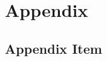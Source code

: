 \section*{Appendix}

\renewcommand{\thesubsection}{\Alph{subsection}}
\renewcommand{\thefigure}{\Alph{subsection}.\arabic{figure}}

\subsection{Appendix Item}
